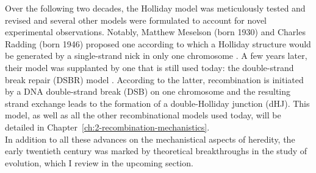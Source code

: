 Over the following two decades, the Holliday model was meticulously tested and revised \citep[reviewed in][]{haber2008evolution} and several other models were formulated to account for novel experimental observations.
Notably, Matthew Meselson (born 1930) and Charles Radding (born 1946) proposed one according to which a Holliday structure would be generated by a single-strand nick in only one chromosome \citep{meselson1975general}.
A few years later, their model was supplanted by one that is still used today: the double-strand break repair (DSBR) model \citep{szostak1983doublestrandbreak}.
According to the latter, recombination is initiated by a DNA double-strand break (DSB) on one chromosome and the resulting strand exchange leads to the formation of a double-Holliday junction (dHJ).
This model, as well as all the other recombinational models used today, will be detailed in Chapter~\ref{ch:2-recombination-mechanistics}.\\

In addition to all these advances on the mechanistical aspects of heredity, the early twentieth century was marked by theoretical breakthroughs in the study of evolution, which I review in the upcoming section.


%


